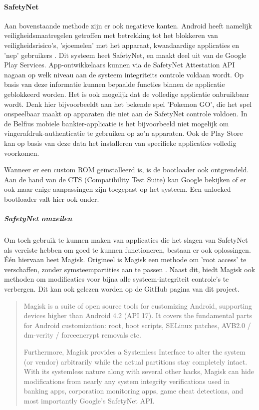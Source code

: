 \paragraph*{SafetyNet}

Aan bovenstaande methode zijn er ook negatieve kanten. Android heeft namelijk veiligheidsmaatregelen getroffen met betrekking tot het blokkeren van veiligheidsrisico's, 'sjoemelen' met het apparaat, kwaadaardige applicaties en 'nep' gebruikers \autocite{android_safetynet}. Dit systeem heet SafetyNet, en maakt deel uit van de Google Play Services. App-ontwikkelaars kunnen via de SafetyNet Attestation API nagaan op welk niveau aan de systeem integriteits controle voldaan wordt. Op basis van deze informatie kunnen bepaalde functies binnen de applicatie geblokkeerd worden. Het is ook mogelijk dat de volledige applicatie onbruikbaar wordt. Denk hier bijvoorbeeldt aan het bekende spel 'Pokemon GO', die het spel onspeelbaar maakt op apparaten die niet aan de SafetyNet controle voldoen. In de Belfius mobiele bankier-applicatie is het bijvoorbeeld niet mogelijk om vingerafdruk-authenticatie te gebruiken op zo'n apparaten. Ook de Play Store kan op basis van deze data het installeren van specifieke applicaties volledig voorkomen.

Wanneer er een custom ROM geïnstalleerd is, is de bootloader ook ontgrendeld. Aan de hand van de CTS (Compatibility Test Suite) kan Google bekijken of er ook maar enige aanpassingen zijn toegepast op het systeem. Een unlocked bootloader valt hier ook onder.

\subparagraph{SafetyNet omzeilen}
Om toch gebruik te kunnen maken van applicaties die het slagen van SafetyNet als vereiste hebben om goed te kunnen functioneren, bestaan er ook oplossingen. Één hiervaan heet Magisk. Origineel is Magisk een methode om 'root access' te verschaffen, zonder symsteempartities aan te passen \autocite{topjohnwu_magisk}. Naast dit, biedt Magisk ook methoden om modificaties voor bijna alle systeem-integriteit controle's te verbergen. Dit kan ook gelezen worden op de GitHub pagina van dit project.
\blockcquote{topjohnwu_magiskgithub}{
 Magisk is a suite of open source tools for customizing Android, supporting devices higher than Android 4.2 (API 17). It covers the fundamental parts for Android customization: root, boot scripts, SELinux patches, AVB2.0 / dm-verity / forceencrypt removals etc.
 
 Furthermore, Magisk provides a Systemless Interface to alter the system (or vendor) arbitrarily while the actual partitions stay completely intact. With its systemless nature along with several other hacks, Magisk can hide modifications from nearly any system integrity verifications used in banking apps, corporation monitoring apps, game cheat detections, and most importantly Google's SafetyNet API.
}

 




